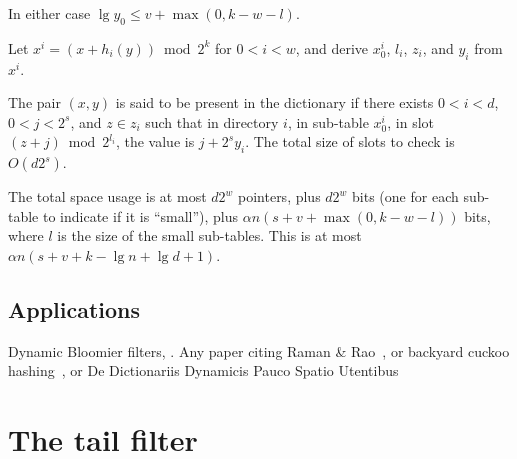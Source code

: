 \documentclass[11pt,letterpaper]{article}
\begin{document}
In either case $\lg y_0 \leq v + \max(0, k - w - l)$.



Let $x^i = (x + h_i(y)) \bmod 2^k$ for $0 < i < w$, and derive $x^i_0$, $l_i$, $z_i$, and $y_i$ from $x^i$.

The pair $(x,y)$ is said to be present in the dictionary if there exists $0 < i < d$, $0 < j < 2^s$, and $z \in z_i$ such that in directory $i$, in sub-table $x^i_0$, in slot $(z + j) \bmod 2^{l_i}$, the value is $j + 2^s y_i$.
The total size of slots to check is $O(d 2^s)$.

The total space usage is at most $d 2^w$ pointers, plus $d 2^w$ bits (one for each sub-table to indicate if it is ``small''), plus $\alpha n (s + v + \max(0, k - w - l))$ bits, where $l$ is the size of the small sub-tables.
This is at most $\alpha n (s + v + k - \lg n + \lg d + 1)$.





\subsection{Applications}

Dynamic Bloomier filters, \cite{DBLP:journals/corr/abs-cs-0502032}. Any paper citing Raman \& Rao~\cite{raman2003succinct}, or backyard cuckoo hashing~\cite{DBLP:journals/corr/abs-0912-5424}, or De Dictionariis Dynamicis Pauco Spatio Utentibus~\cite{DBLP:journals/corr/abs-cs-0512081}

\section{The tail filter}
\end{document}
